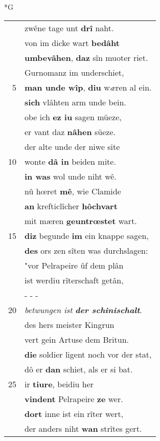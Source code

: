 \documentclass[8pt,a4paper,notitlepage]{article}
\begin{document}
\newpage
\begin{table}[ht]
\begin{minipage}[t]{0.5\linewidth}
\small
\begin{center}*G
\end{center}
\begin{tabular}{rl}
 & zwêne tage unt \textbf{drî} naht.\\ 
 & von im dicke wart \textbf{bedâht}\\ 
 & \textbf{umbevâhen}, \textbf{daz} sîn muoter riet.\\ 
 & Gurnomanz im underschiet,\\ 
5 & \textbf{man unde wîp}, \textbf{diu} w\textit{æ}ren al ein.\\ 
 & \textbf{sich} vlâhten arm unde bein.\\ 
 & obe ich \textbf{ez iu} sagen müeze,\\ 
 & er vant daz \textbf{nâhen} süeze.\\ 
 & der alte unde der niwe site\\ 
10 & wonte \textbf{dâ in} beiden mite.\\ 
 & \textbf{in was} wol unde niht wê.\\ 
 & nû hœret \textbf{mê}, wie Clamide\\ 
 & \textbf{an} krefticlîcher \textbf{hôchvart}\\ 
 & mit mæren \textbf{geuntrœstet} wart.\\ 
15 & \textbf{diz} begunde \textbf{im} ein knappe sagen,\\ 
 & \textbf{des} ors zen sîten was durchslagen:\\ 
 & "vor Pelrapeire ûf dem plân\\ 
 & ist werdiu rîterschaft getân,\\ 
 & \multicolumn{1}{l}{ - - - }\\ 
20 & \textit{betwungen ist} \textit{\textbf{der schinischalt}}.\\ 
 & des hers meister Kingrun\\ 
 & vert gein Artuse dem Britun.\\ 
 & \textbf{die} soldier ligent noch vor der stat,\\ 
 & dô er \textbf{dan} schiet, als er si bat.\\ 
25 & ir \textbf{tiure}, beidiu her\\ 
 & \textbf{vindent} Pelrapeire \textbf{ze} wer.\\ 
 & \textbf{dort} inne ist ein rîter wert,\\ 
 & der anders niht \textbf{wan} strîtes gert.\\ 

\end{tabular}
\end{minipage}
\end{table}
\end{document}
